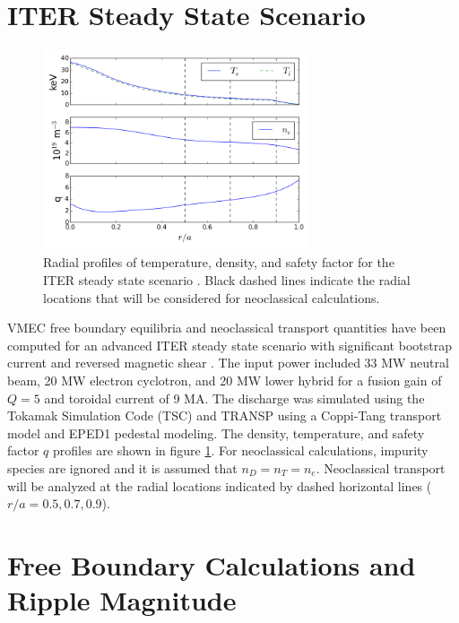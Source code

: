 \documentclass{article}
\begin{document}
\section{ITER Steady State Scenario}\label{steadystate}

\FloatBarrier

\begin{figure}[h!]
\centering
\includegraphics[width=0.7\textwidth]{profiles.png}
\caption{\label{fig:profiles} Radial profiles of temperature, density, and safety factor for the ITER steady state scenario \cite{Poli2014}. Black dashed lines indicate the radial locations that will be considered for neoclassical calculations.}
\end{figure}

VMEC free boundary equilibria and neoclassical transport quantities have been computed for an advanced ITER steady state scenario with significant bootstrap current and reversed magnetic shear \cite{Poli2014}. The input power included 33 MW neutral beam, 20 MW electron cyclotron, and 20 MW lower hybrid for a fusion gain of $Q = 5$ and toroidal current of 9 MA. The discharge was simulated using the Tokamak Simulation Code (TSC) \cite{Jardin1986} and TRANSP \cite{Hawryluk1980} using a Coppi-Tang transport model and EPED1 \cite{Snyder2011} pedestal modeling. The density, temperature, and safety factor $q$ profiles are shown in figure \ref{fig:profiles}. For neoclassical calculations, impurity species are ignored and it is assumed that $n_D = n_T = n_e$. Neoclassical transport will be analyzed at the radial locations indicated by dashed horizontal lines ($r/a = 0.5, 0.7, 0.9$). 

\FloatBarrier

\section{Free Boundary Calculations and Ripple Magnitude} \label{vmec}
\end{document}
